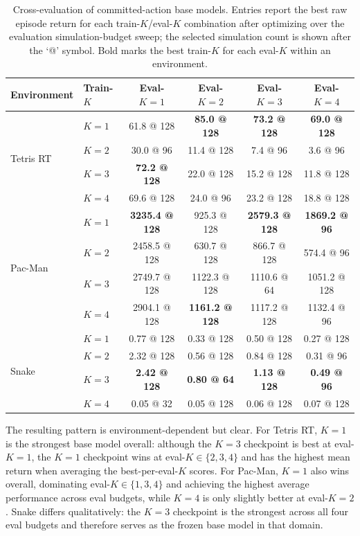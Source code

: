 \begin{table}[h]
  \centering
  \small
  \setlength{\tabcolsep}{5pt}
  \begin{tabular}{llcccc}
    \toprule
    Environment & Train-$K$ & Eval-$K{=}1$ & Eval-$K{=}2$ & Eval-$K{=}3$ & Eval-$K{=}4$ \\
    \midrule
    \multirow{4}{*}{Tetris RT}
      & $K{=}1$ & 61.8 @ 128 & \textbf{85.0 @ 128} & \textbf{73.2 @ 128} & \textbf{69.0 @ 128} \\
      & $K{=}2$ & 30.0 @ 96  & 11.4 @ 128          & 7.4 @ 96            & 3.6 @ 96 \\
      & $K{=}3$ & \textbf{72.2 @ 128} & 22.0 @ 128 & 15.2 @ 128 & 11.8 @ 128 \\
      & $K{=}4$ & 69.6 @ 128 & 24.0 @ 96           & 23.2 @ 128          & 18.8 @ 128 \\
    \midrule
    \multirow{4}{*}{Pac-Man}
      & $K{=}1$ & \textbf{3235.4 @ 128} & 925.3 @ 128 & \textbf{2579.3 @ 128} & \textbf{1869.2 @ 96} \\
      & $K{=}2$ & 2458.5 @ 128 & 630.7 @ 128 & 866.7 @ 128 & 574.4 @ 96 \\
      & $K{=}3$ & 2749.7 @ 128 & 1122.3 @ 128 & 1110.6 @ 64 & 1051.2 @ 128 \\
      & $K{=}4$ & 2904.1 @ 128 & \textbf{1161.2 @ 128} & 1117.2 @ 128 & 1132.4 @ 96 \\
    \midrule
    \multirow{4}{*}{Snake}
      & $K{=}1$ & 0.77 @ 128 & 0.33 @ 128 & 0.50 @ 128 & 0.27 @ 128 \\
      & $K{=}2$ & 2.32 @ 128 & 0.56 @ 128 & 0.84 @ 128 & 0.31 @ 96 \\
      & $K{=}3$ & \textbf{2.42 @ 128} & \textbf{0.80 @ 64} & \textbf{1.13 @ 128} & \textbf{0.49 @ 96} \\
      & $K{=}4$ & 0.05 @ 32  & 0.05 @ 128 & 0.06 @ 128 & 0.07 @ 128 \\
    \bottomrule
  \end{tabular}
  \caption{
    Cross-evaluation of committed-action base models.
    Entries report the best raw episode return for each train-$K$/eval-$K$
    combination after optimizing over the evaluation simulation-budget sweep;
    the selected simulation count is shown after the `@' symbol. Bold marks the
    best train-$K$ for each eval-$K$ within an environment.}
\end{table}

The resulting pattern is environment-dependent but clear.
For Tetris RT, $K{=}1$ is the strongest base model overall: although the
$K{=}3$ checkpoint is best at eval-$K{=}1$, the $K{=}1$ checkpoint wins at
eval-$K \in \{2,3,4\}$ and has the highest mean return when averaging the
best-per-eval-$K$ scores.
For Pac-Man, $K{=}1$ also wins overall, dominating eval-$K \in \{1,3,4\}$ and
achieving the highest average performance across eval budgets, while $K{=}4$
is only slightly better at eval-$K{=}2$.
Snake differs qualitatively: the $K{=}3$ checkpoint is the strongest across all
four eval budgets and therefore serves as the frozen base model in that domain.

